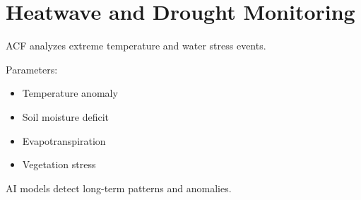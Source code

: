 \section{Heatwave and Drought Monitoring}


ACF analyzes extreme temperature and water stress events.



Parameters:


\begin{itemize}

\item Temperature anomaly

\item Soil moisture deficit

\item Evapotranspiration

\item Vegetation stress

\end{itemize}



AI models detect long-term patterns and anomalies.
